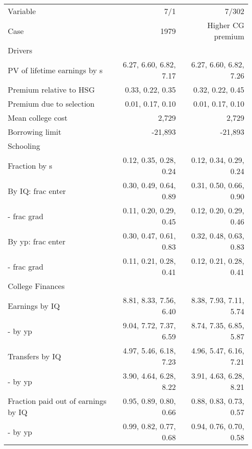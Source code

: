 \begin{tabular}{lrr}
\hline
Variable & 7/1  & 7/302  \\ 
Case & 1979  & Higher CG premium  \\ 
Drivers &   &   \\ 
PV of lifetime earnings by s & 6.27, 6.60, 6.82, 7.17  & 6.27, 6.60, 6.82, 7.26  \\ 
Premium relative to HSG & 0.33, 0.22, 0.35  & 0.32, 0.22, 0.45  \\ 
Premium due to selection & 0.01, 0.17, 0.10  & 0.01, 0.17, 0.10  \\ 
Mean college cost & 2,729  & 2,729  \\ 
Borrowing limit & -21,893  & -21,893  \\ 
\hline
Schooling &   &   \\ 
Fraction by s & 0.12, 0.35, 0.28, 0.24  & 0.12, 0.34, 0.29, 0.24  \\ 
By IQ: frac enter & 0.30, 0.49, 0.64, 0.89  & 0.31, 0.50, 0.66, 0.90  \\ 
- frac grad & 0.11, 0.20, 0.29, 0.45  & 0.12, 0.20, 0.29, 0.46  \\ 
By yp: frac enter & 0.30, 0.47, 0.61, 0.83  & 0.32, 0.48, 0.63, 0.83  \\ 
- frac grad & 0.11, 0.21, 0.28, 0.41  & 0.12, 0.21, 0.28, 0.41  \\ 
\hline
College Finances &   &   \\ 
Earnings by IQ & 8.81, 8.33, 7.56, 6.40  & 8.38, 7.93, 7.11, 5.74  \\ 
- by yp & 9.04, 7.72, 7.37, 6.59  & 8.74, 7.35, 6.85, 5.87  \\ 
Transfers by IQ & 4.97, 5.46, 6.18, 7.23  & 4.96, 5.47, 6.16, 7.21  \\ 
- by yp & 3.90, 4.64, 6.28, 8.22  & 3.91, 4.63, 6.28, 8.21  \\ 
Fraction paid out of earnings by IQ & 0.95, 0.89, 0.80, 0.66  & 0.88, 0.83, 0.73, 0.57  \\ 
- by yp & 0.99, 0.82, 0.77, 0.68  & 0.94, 0.76, 0.70, 0.58  \\ 
\hline
\end{tabular}%
